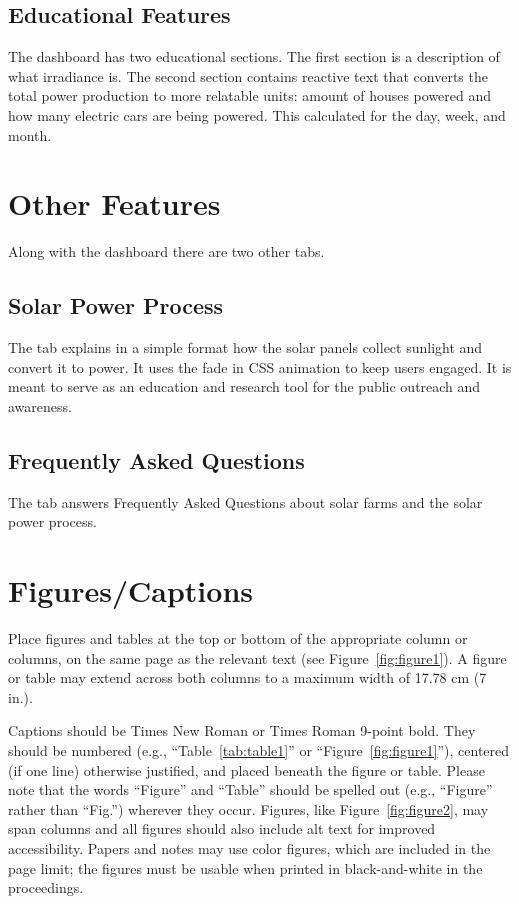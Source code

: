 \documentclass{sigchi}
\begin{document}
\subsection{Educational Features}
The dashboard has two educational sections. The first section is a description of what irradiance is. The second section contains reactive text that converts the total power production to more relatable units: amount of houses powered and how many electric cars are being powered. This calculated for the day, week, and month.

\section{Other Features}
Along with the dashboard there are two other tabs.
\subsection{Solar Power Process}
The tab explains in a simple format how the solar panels collect sunlight and convert it to power. It uses the fade in CSS animation to keep users engaged. It is meant to serve as an education and research tool for the public outreach and awareness.
\subsection{Frequently Asked Questions}
The tab answers Frequently Asked Questions about solar farms and the solar power process. 
\section{Figures/Captions}

Place figures and tables at the top or bottom of the appropriate
column or columns, on the same page as the relevant text (see
Figure~\ref{fig:figure1}). A figure or table may extend across both
columns to a maximum width of 17.78 cm (7 in.).


Captions should be Times New Roman or Times Roman 9-point bold.  They
should be numbered (e.g., ``Table~\ref{tab:table1}'' or
``Figure~\ref{fig:figure1}''), centered (if one line) otherwise justified, and placed beneath the figure
or table.  Please note that the words ``Figure'' and ``Table'' should
be spelled out (e.g., ``Figure'' rather than ``Fig.'') wherever they
occur. Figures, like Figure~\ref{fig:figure2}, may span columns and
all figures should also include alt text for improved accessibility.
Papers and notes may use color figures, which are included in the page
limit; the figures must be usable when printed in black-and-white in
the proceedings.
\end{document}
